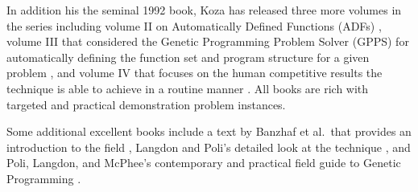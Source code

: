 In addition his the seminal 1992 book, Koza has released three more volumes in the series including volume II on Automatically Defined Functions (ADFs) \cite{Koza1994}, volume III that considered the Genetic Programming Problem Solver (GPPS) for automatically defining the function set and program structure for a given problem \cite{Koza1999}, and volume IV that focuses on the human competitive results the technique is able to achieve in a routine manner \cite{Koza2003}. All books are rich with targeted and practical demonstration problem instances.

Some additional excellent books include a text by Banzhaf et al.\ that provides an introduction to the field \cite{Banzhaf1998}, Langdon and Poli's detailed look at the technique \cite{Langdon2002}, and Poli, Langdon, and McPhee's contemporary and practical field guide to Genetic Programming \cite{Poli2008}.


